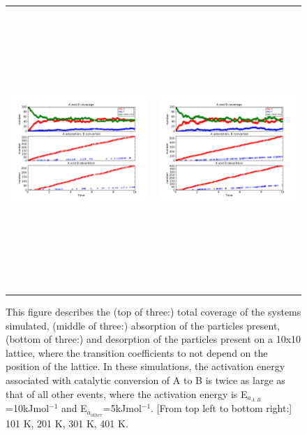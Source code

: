 \documentclass[11pt]{article}
\begin{document}
\begin{figure}[h!]
\begin{tabular}{cc}
\includegraphics[width=3.5in, height=4.2in]{./coadsorb_irreversible/AtoBirreversible10x10_301_AtoB2x_Ea5E3_Eirr10E3_3.png} &
\includegraphics[width=3.5in, height=4.2in]{./coadsorb_irreversible/AtoBirreversible10x10_401_AtoB2x_Ea5E3_Eirr10E3_3.png}
\end{tabular}
\caption{This figure describes the (top of three:) total coverage of the systems simulated, (middle of three:) absorption of the particles present, (bottom of three:) and desorption of the particles present on a 10x10 lattice, where the transition coefficients to not depend on the position of the lattice. In these simulations, the activation energy associated with catalytic conversion of A to B is twice as large as that of all other events, where the activation energy is E$_{a_{A:B}}$=10kJmol$^{-1}$ and E$_{a_{other}}$=5kJmol$^{-1}$. [From top left to bottom right:] 101 K, 201 K, 301 K, 401 K. }
\end{figure}
\end{document}
